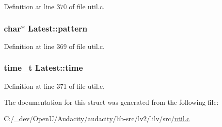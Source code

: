 Definition at line 370 of file util.\+c.

\subsubsection[{\texorpdfstring{pattern}{pattern}}]{\setlength{\rightskip}{0pt plus 5cm}char$\ast$ Latest\+::pattern}\hypertarget{struct_latest_aa3f983c4a8a31b7e12d6127cea049617}{}\label{struct_latest_aa3f983c4a8a31b7e12d6127cea049617}


Definition at line 369 of file util.\+c.

\subsubsection[{\texorpdfstring{time}{time}}]{\setlength{\rightskip}{0pt plus 5cm}time\+\_\+t Latest\+::time}\hypertarget{struct_latest_a85a1c0ea155ddbfc9a793ad884498e0e}{}\label{struct_latest_a85a1c0ea155ddbfc9a793ad884498e0e}


Definition at line 371 of file util.\+c.



The documentation for this struct was generated from the following file\+:\begin{DoxyCompactItemize}
\item 
C\+:/\+\_\+dev/\+Open\+U/\+Audacity/audacity/lib-\/src/lv2/lilv/src/\hyperlink{lv2_2lilv_2src_2util_8c}{util.\+c}\end{DoxyCompactItemize}
